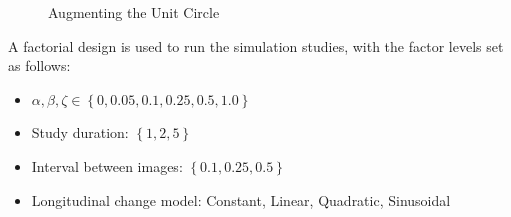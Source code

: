 \documentclass[11pt,reqno]{article}
\theoremstyle{definition}
\begin{document}
\begin{figure}%
  \centering
  \hfill
  \caption{Augmenting the Unit Circle}
  \label{fig:unit_circle_augmentation}
\end{figure}

A factorial design is used to run the simulation studies, with the factor levels set as follows:
\begin{itemize}
  \item $\alpha, \beta, \zeta \in \left\{0, 0.05, 0.1, 0.25, 0.5, 1.0\right\}$
  \item Study duration: $\left\{1, 2, 5\right\}$
  \item Interval between images: $\left\{0.1, 0.25, 0.5\right\}$
  \item Longitudinal change model: Constant, Linear, Quadratic, Sinusoidal
\end{itemize}
\end{document}
